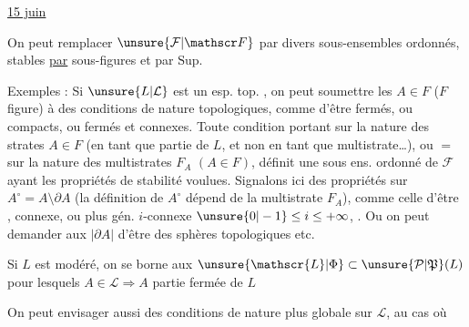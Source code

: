  \uline{15 juin}

On peut remplacer $\unsure{\mathcal F|\mathscr F}$ par divers  sous-ensembles ordonnés, stables \uline{par} \deleted{$\unsure{\leq|\in}$}  
sous-figures  et par $\mathrm{Sup}$.

Exemples : Si $\unsure{L|\mathcal L}$ est un esp. top. , 
on peut soumettre les $A\in F$  ($F$ figure)
à des conditions de nature topologiques, comme d'être fermés, ou  compacts, ou fermés et connexes. Toute condition
portant sur la nature des strates $A\in F$ (en tant que partie de $L$, et non en tant que multistrate\ldots), ou $=$ sur la nature des
multistrates $F_A$ $(A\in F)$, définit une sous ens. ordonné de $\mathcal F$ ayant les propriétés de stabilité voulues. Signalons ici
des propriétés  sur  $A^\circ=A\setminus\partial A$ (la définition de $A^\circ$ dépend de la multistrate $F_A$), comme celle d'être  ,
  connexe, ou plus gén. $i$-connexe $\unsure{0|-1}\leq i\leq+\infty$,  . Ou on peut demander aux $|\partial A|$
d'être des sphères topologiques etc.

Si $L$ est  modéré, on se borne aux $\unsure{\mathscr{L}|\Phi}\subset\unsure{\mathcal P|\mathfrak P}(L)$ pour lesquels $A\in\mathscr{L}\Longrightarrow A$ partie fermée \uline{} de $L$

On peut envisager aussi des conditions de nature plus globale sur $\mathscr{L}$, au cas où
